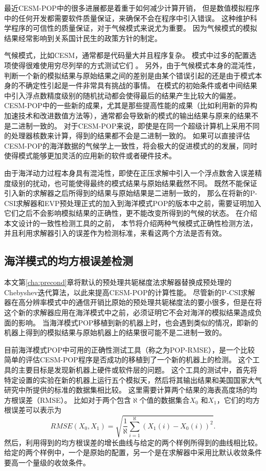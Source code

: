 最近CESM-POP中的很多进展都是着重于如何减少计算开销\cite{yong2015}， 但是数值模拟程序中的任何开发都需要软件质量保证，来确保不会在程序中引入错误。 
这种维护科学程序的可信性的质量保证，对于气候模式来说尤为重要。 
因为气候模式的模拟结果经常影响到关系国计民生的政策方针的制定\cite{carson2002, easterbrook2011}。 

  
气候模式，比如CESM，通常都是代码量大并且程序复杂。 
模式中过多的配置选项使得很难使用穷尽列举的方式测试它们 \cite{clune2011, pipitone2012}。 
另外，由于气候模式本身的混沌性，判断一个新的模拟结果与原始结果之间的差别是由某个错误引起的还是由于模式本身的不确定性引起是一件非常具有挑战的事情。 
在模式的初始条件或者中间结果中引入浮点数精度级别的随机扰动都会使得最后的结果产生比较大的偏差。
CESM-POP中的一些新的成果，尤其是那些提高性能的成果（比如利用新的异构加速技术和改进数值方法等），通常都会导致新的模式的输出结果与原来的结果不是二进制一致的。 
对于CESM-POP来说，即使是在同一个超级计算机上采用不同的处理器核数来计算，得到的结果都不会是二进制一致的。 
如果可以直接评估CESM-POP的海洋数据的气候学上一致性，将会极大的促进模式的的发展，同时使得模式能够更加灵活的应用新的软件或者硬件技术。 

由于海洋动力过程本身具有混沌性，即使在正压求解中引入一个浮点数舍入误差精度级别的扰动，也可能使得最终的模式结果与原始结果截然不同。 
既然不能保证引入新的求解器之后所得到的结果与原始结果是二进制一致的，
那么在将新的P-CSI求解器和EVP预处理正式的加入到海洋模式POP的版本中之前，需要证明加入它们之后不会影响模拟结果的正确性，更不能改变所得到的气候的状态。
在介绍本文设计的一致性检测工具的之前，
本节将介绍两种气候模式正确性检测方法，并且利用求解器引入的误差作为检测标准，来看这两个方法是否有效。


\subsection{海洋模式的均方根误差检测}
\label{verify:premethod}
 
本文第\ref{cha:precond}章将默认的预处理共轭梯度法求解器替换成预处理的Chebyshev迭代算法，以此来提高CESM-POP的计算性能。
尽管新的P-CSI求解器在高分辨率模式中的通信开销比原始的预处理共轭梯度法的要小很多，但是在将这个新的求解器应用在海洋模式中之前，必须证明它不会对海洋的模拟结果造成负面的影响。 
当海洋模式POP移植到新的机器上时，也会遇到类似的情况，即新的机器上得到的模拟结果与原始机器上的结果很可能不是二进制一致的。 

目前海洋模式POP中可用的正确性测试工具（称之为POP-RMSE），是一个比较简单的评估CESM-POP程序是否成功的移植到了一个新的机器上的检测。 
这个工具的主要目标是发现新机器上硬件或软件层的问题。 
这个工具的测试中，首先将特定设置的实验在新的机器上运行五个模拟天，然后将其输出结果和美国国家大气研究中所提供的标准的数据集相比较。
这里需要计算两个结果的海表高度场的均方根误差（RMSE）。 
比如对于两个包含$\aleph$个值的数据集合$X_0$ 和$X_1$，它们的均方根误差可以表示为
 \begin{equation*}
 RMSE(X_0, X_1) = \sqrt{\frac{1}{\aleph}\sum_{i=1}^\aleph(X_1(i)-X_0(i))^2}.
 \end{equation*}
然后，利用得到的均方根误差的增长曲线与给定的两个样例所得到的曲线相比较。 
给定的两个样例中，一个是原始的配置，另一个是在求解器中采用比默认收敛条件要高一个量级的收敛条件。 


